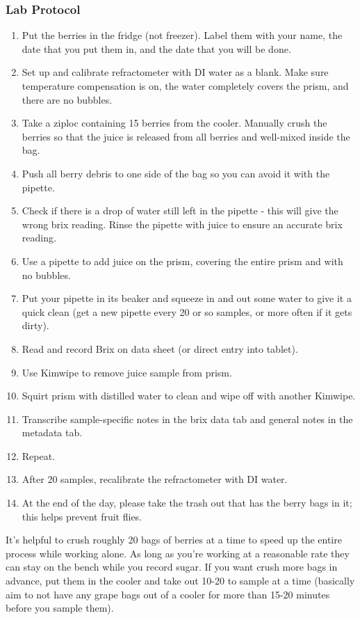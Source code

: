 \documentclass[11pt,letter]{article}
\begin{document}
\subsubsection{Lab Protocol}
\begin{enumerate}
\item Put the berries in the fridge (not freezer). Label them with your name, the date that you put them in, and the date that you will be done.
\item Set up and calibrate refractometer with DI water as a blank. Make sure temperature compensation is on, the water completely covers the prism, and there are no bubbles. 
\item Take a ziploc containing 15 berries from the cooler. Manually crush the berries so that the juice is released from all berries and well-mixed inside the bag. 
\item Push all berry debris to one side of the bag so you can avoid it with the pipette.
\item Check if there is a drop of water still left in the pipette - this will give the wrong brix reading. Rinse the pipette with juice to ensure an accurate brix reading.
\item Use a pipette to add juice on the prism, covering the entire prism and with no bubbles.
\item Put your pipette in its beaker and squeeze in and out some water to give it a quick clean (get a new pipette every 20 or so samples, or more often if it gets dirty). 
\item Read and record Brix on data sheet (or direct entry into tablet).   
\item Use Kimwipe to remove juice sample from prism. 
\item Squirt prism with distilled water to clean and wipe off with another Kimwipe. 
\item Transcribe sample-specific notes in the brix data tab and general notes in the metadata tab.
\item Repeat. 
\item After 20 samples, recalibrate the refractometer with DI water.
\item At the end of the day, please take the trash out that has the berry bags in it; this helps prevent fruit flies.
\end{enumerate}

It’s helpful to crush roughly 20 bags of berries at a time to speed up the entire process while working alone. As long as you're working at a reasonable rate they can stay on the bench while you record sugar. If you want crush more bags in advance, put them in the cooler and take out 10-20 to sample at a time (basically aim to not have any grape bags out of a cooler for more than 15-20 minutes before you sample them).\\
\end{document}
